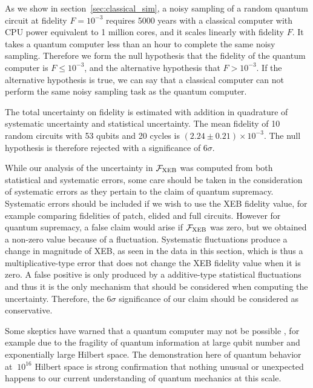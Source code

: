 As we show in section~\ref{sec:classical_sim}, a noisy sampling of a random quantum circuit at fidelity $F = 10^{-3}$ requires 5000 years with a classical computer with CPU power equivalent to 1 million cores, and it scales linearly with fidelity $F$. It takes a quantum computer less than an hour to complete the
same noisy sampling. Therefore we form the null hypothesis that the fidelity of the quantum computer is $F \le 10^{-3}$, and the alternative hypothesis that $F > 10^{-3}$. If the alternative hypothesis is true, we can say that a classical computer can not perform the same noisy sampling task as the quantum computer.

The total uncertainty on fidelity is estimated with addition in quadrature of systematic uncertainty and statistical uncertainty. The mean fidelity of 10 random
circuits with 53 qubits and 20 cycles is $(2.24 \pm 0.21) \times 10^{-3}$. The
null hypothesis is therefore rejected with a significance of $6\sigma$.

While our analysis of the uncertainty in $\mathcal{F}_{\text{XEB}}$ was computed from both statistical and systematic errors, some care should be taken in the consideration of systematic errors as they pertain to the claim of quantum supremacy. Systematic errors should be included if we wish to use the XEB fidelity value, for example comparing fidelities of patch, elided and full circuits. However for quantum supremacy, a false claim would arise if $\mathcal{F}_{\text{XEB}}$ was zero, but we obtained a non-zero value because of a fluctuation.  Systematic fluctuations produce a change in magnitude of XEB, as seen in the data in this section, which is thus a multiplicative-type error that does not change the XEB fidelity value when it is zero.  A false positive is only produced by a additive-type statistical fluctuations and thus it is the only mechanism that should be considered when computing the uncertainty. Therefore, the $6\sigma$ significance of our claim should be considered as conservative.

Some skeptics have warned that a quantum computer may not be possible \cite{Dyakonov18,Kalai19}, for example due to the fragility of quantum information at large qubit number and exponentially large Hilbert space.  The demonstration here of quantum behavior at $~10^{16}$ Hilbert space is strong confirmation that nothing unusual or unexpected happens to our current understanding of quantum mechanics at this scale.
